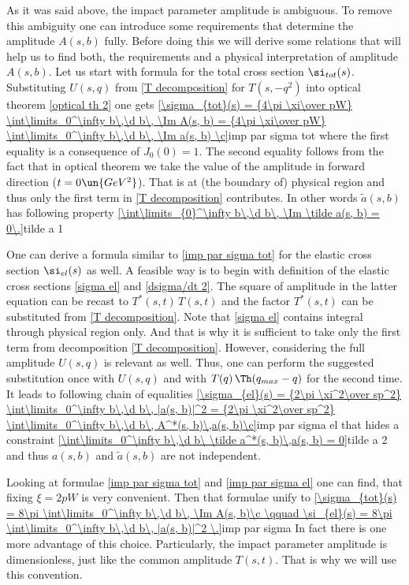 As it was said above, the impact parameter amplitude is ambiguous. To remove this ambiguity one can introduce some requirements that determine the amplitude $A(s, b)$ fully. Before doing this we will derive some relations that will help us to find both, the requirements and a physical interpretation of amplitude $A(s, b)$. Let us start with formula for the total cross section $\si_{tot}(s)$. Substituting $U(s, q)$ from \equ{} \ref{T decomposition} for $T(s, -q^2)$ into optical theorem \ref{optical th 2} one gets
\eqref{\sigma_{tot}(s) = {4\pi \xi\over pW} \int\limits_0^\infty b\,\d b\, \Im A(s, b) = {4\pi \xi\over pW} \int\limits_0^\infty b\,\d b\, \Im a(s, b) \c}{imp par sigma tot}
where the first equality is a consequence of $J_0(0) = 1$. The second equality follows from the fact that in optical theorem we take the value of the amplitude in forward direction ($t = 0\un{GeV^2}$). That is at (the boundary of) physical region and thus only the first term in \ref{T decomposition} contributes. In other words $\tilde a(s, b)$ has following property
\eqref{\int\limits_{0}^\infty b\,\d b\, \Im \tilde a(s, b) = 0\.}{tilde a 1}

One can derive a formula similar to \equ{} \ref{imp par sigma tot} for the elastic cross section $\si_{el}(s)$ as well. A feasible way is to begin with definition of the elastic cross sections \ref{sigma el} and \ref{dsigma/dt 2}. The square of amplitude in the latter equation can be recast to $T^*(s, t)\,T(s, t)$ and the factor $T^*(s, t)$ can be substituted from \equ{} \ref{T decomposition}. Note that \equ{} \ref{sigma el} contains integral through physical region only. And that is why it is sufficient to take only the first term from decomposition \ref{T decomposition}. However, considering the full amplitude $U(s, q)$ is relevant as well. Thus, one can perform the suggested substitution once with $U(s, q)$ and with $T(q)\,\Th(q_{max}-q)$ for the second time. It leads to following chain of equalities
\eqref{\sigma_{el}(s) = {2\pi \xi^2\over sp^2} \int\limits_0^\infty b\,\d b\, |a(s, b)|^2 = {2\pi \xi^2\over sp^2} \int\limits_0^\infty b\,\d b\, A^*(s, b)\,a(s, b)\c}{imp par sigma el}
that hides a constraint 
\eqref{\int\limits_0^\infty b\,\d b\ \tilde a^*(s, b)\,a(s, b) = 0}{tilde a 2}
and thus $a(s, b)$ and $\tilde a(s, b)$ are not independent.

Looking at formulae \ref{imp par sigma tot} and \ref{imp par sigma el} one can find, that fixing $\xi = 2pW$ is very convenient. Then that formulae unify to
\eqref{\sigma_{tot}(s) = 8\pi \int\limits_0^\infty b\,\d b\, \Im A(s, b)\c \qquad \si_{el}(s) = 8\pi \int\limits_0^\infty b\,\d b\, |a(s, b)|^2 \.}{imp par sigma}
In fact there is one more advantage of this choice. Particularly, the impact parameter amplitude is dimensionless, just like the common amplitude $T(s, t)$. That is why we will use this convention.


